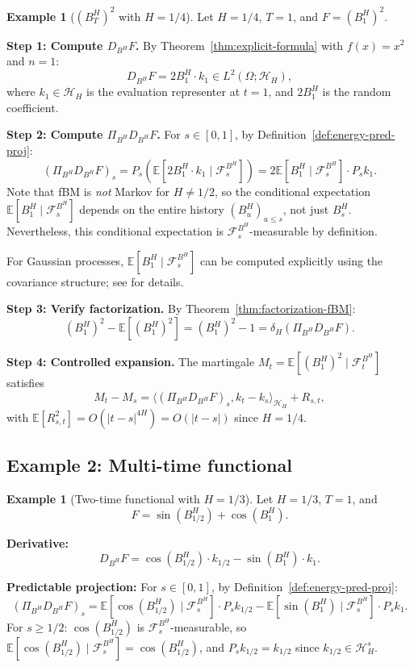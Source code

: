 \documentclass[11pt,a4paper]{article}
\theoremstyle{plain}
\theoremstyle{definition}
\newtheorem{example}[theorem]{Example}
\theoremstyle{remark}
\newcommand{\E}{\mathbb{E}}
\newcommand{\ip}[2]{\langle #1, #2 \rangle}
\newcommand{\Lp}[1]{L^{#1}}
\newcommand{\Ft}{\mathcal{F}_t}
\newcommand{\Fs}{\mathcal{F}_s}
\newcommand{\HH}{\mathcal{H}_H}
\begin{document}
\begin{example}[$(B^H_T)^2$ with $H = 1/4$]\label{ex:quadratic}
Let $H = 1/4$, $T = 1$, and $F = (B^H_1)^2$.

\textbf{Step 1: Compute $D_{B^H} F$.}
By Theorem~\ref{thm:explicit-formula} with $f(x) = x^2$ and $n = 1$:
\[
D_{B^H} F = 2B^H_1 \cdot k_1 \in \Lp{2}(\Omega; \HH),
\]
where $k_1 \in \HH$ is the evaluation representer at $t = 1$, and $2B^H_1$ is the random coefficient.

\textbf{Step 2: Compute $\Pi_{B^H} D_{B^H} F$.}
For $s \in [0, 1]$, by Definition~\ref{def:energy-pred-proj}:
\[
(\Pi_{B^H} D_{B^H} F)_s = P_s\left(\E[2B^H_1 \cdot k_1 \mid \Fs^{B^H}]\right) = 2\E[B^H_1 \mid \Fs^{B^H}] \cdot P_s k_1.
\]
Note that fBM is \emph{not} Markov for $H \neq 1/2$, so the conditional expectation $\E[B^H_1 \mid \Fs^{B^H}]$ depends on the entire history $(B^H_u)_{u \leq s}$, not just $B^H_s$. Nevertheless, this conditional expectation is $\Fs^{B^H}$-measurable by definition.

For Gaussian processes, $\E[B^H_1 \mid \Fs^{B^H}]$ can be computed explicitly using the covariance structure; see \cite{Nualart06} for details.

\textbf{Step 3: Verify factorization.}
By Theorem~\ref{thm:factorization-fBM}:
\[
(B^H_1)^2 - \E[(B^H_1)^2] = (B^H_1)^2 - 1 = \delta_H(\Pi_{B^H} D_{B^H} F).
\]

\textbf{Step 4: Controlled expansion.}
The martingale $M_t = \E[(B^H_1)^2 \mid \Ft^{B^H}]$ satisfies
\[
M_t - M_s = \ip{(\Pi_{B^H} D_{B^H} F)_s}{k_t - k_s}_{\HH} + R_{s,t},
\]
with $\E[R_{s,t}^2] = O(|t-s|^{4H}) = O(|t-s|)$ since $H = 1/4$.
\end{example}

\subsection{Example 2: Multi-time functional}

\begin{example}[Two-time functional with $H = 1/3$]\label{ex:two-time}
Let $H = 1/3$, $T = 1$, and
\[
F = \sin(B^H_{1/2}) + \cos(B^H_1).
\]

\textbf{Derivative:}
\[
D_{B^H} F = \cos(B^H_{1/2}) \cdot k_{1/2} - \sin(B^H_1) \cdot k_1.
\]

\textbf{Predictable projection:} For $s \in [0, 1]$, by Definition~\ref{def:energy-pred-proj}:
\[
(\Pi_{B^H} D_{B^H} F)_s = \E[\cos(B^H_{1/2}) \mid \Fs^{B^H}] \cdot P_s k_{1/2} - \E[\sin(B^H_1) \mid \Fs^{B^H}] \cdot P_s k_1.
\]
For $s \geq 1/2$: $\cos(B^H_{1/2})$ is $\Fs^{B^H}$-measurable, so $\E[\cos(B^H_{1/2}) \mid \Fs^{B^H}] = \cos(B^H_{1/2})$, and $P_s k_{1/2} = k_{1/2}$ since $k_{1/2} \in \HH^s$.
\end{example}
\end{document}
